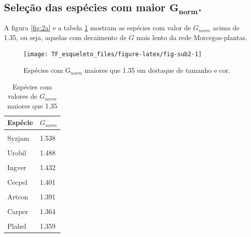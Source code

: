 \documentclass[
  12pt,
]{article}
\begin{document}
\hypertarget{seleuxe7uxe3o-das-espuxe9cies-com-maior-mathbfg_norm.}{%
\subsection{\texorpdfstring{Seleção das espécies com maior
\(\mathbf{G_{norm}}\).}{Seleção das espécies com maior \textbackslash mathbf\{G\_\{norm\}\}.}}\label{seleuxe7uxe3o-das-espuxe9cies-com-maior-mathbfg_norm.}}

A figura \ref{fig:2a} e a tabela \ref{tab:3} mostram as espécies com
valor de \(G_{norm}\) acima de 1.35, ou seja, aquelas com decaimento de
\(G\) mais lento da rede Morcegos-plantas.

\begin{figure}[H]

{\centering \texttt{[image: TF\_esqueleto\_files/figure-latex/fig-sub2-1]} 

}

\caption{\label{fig:2a}Espécies com G$_{norm}$ maiores que  1.35 em destaque de tamanho e cor.}\label{fig:fig-sub2}
\end{figure}

\begin{table}[!h]

\caption{\label{tab:tabela_decimento_lento}\label{tab:3}Espécies com valores de $G_{norm}$ maiores que 1.35}
\centering
\begin{tabular}[t]{ll}
\toprule
Espécie & $G_{norm}$\\
\midrule
\cellcolor{gray!6}{Artjam} & \cellcolor{gray!6}{1.548}\\
Syzjam & 1.538\\
\cellcolor{gray!6}{Artlit} & \cellcolor{gray!6}{1.509}\\
Urobil & 1.488\\
\cellcolor{gray!6}{Stulil} & \cellcolor{gray!6}{1.469}\\
\addlinespace
Ingver & 1.432\\
\cellcolor{gray!6}{Carcas} & \cellcolor{gray!6}{1.401}\\
Cecpel & 1.401\\
\cellcolor{gray!6}{Carbre} & \cellcolor{gray!6}{1.392}\\
Artcon & 1.391\\
\addlinespace
\cellcolor{gray!6}{Vamnym} & \cellcolor{gray!6}{1.365}\\
Carper & 1.364\\
\cellcolor{gray!6}{Manzap} & \cellcolor{gray!6}{1.360}\\
Plahel & 1.359\\
\bottomrule
\end{tabular}
\end{table}
\end{document}
